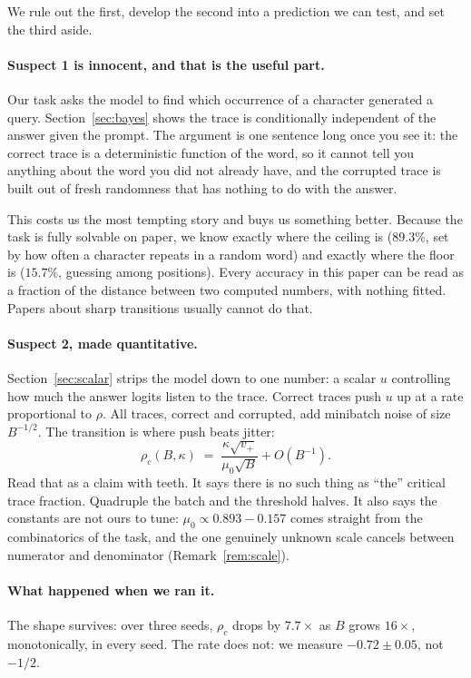 \documentclass{article}
\theoremstyle{plain}
\theoremstyle{definition}
\theoremstyle{remark}
\newcommand{\1}{\mathbf{1}}
\begin{document}
We rule out the first, develop the second into a prediction we can test, and set
the third aside.

\paragraph{Suspect 1 is innocent, and that is the useful part.}
Our task asks the model to find which occurrence of a character generated a
query. Section~\ref{sec:bayes} shows the trace is conditionally independent of
the answer given the prompt. The argument is one sentence long once you see it:
the correct trace is a deterministic function of the word, so it cannot tell you
anything about the word you did not already have, and the corrupted trace is
built out of fresh randomness that has nothing to do with the answer.

This costs us the most tempting story and buys us something better. Because the
task is fully solvable on paper, we know exactly where the ceiling is
($89.3\%$, set by how often a character repeats in a random word) and exactly
where the floor is ($15.7\%$, guessing among positions). Every accuracy in this
paper can be read as a fraction of the distance between two computed numbers,
with nothing fitted. Papers about sharp transitions usually cannot do that.

\paragraph{Suspect 2, made quantitative.}
Section~\ref{sec:scalar} strips the model down to one number: a scalar $u$
controlling how much the answer logits listen to the trace. Correct traces push
$u$ up at a rate proportional to $\rho$. All traces, correct and corrupted, add
minibatch noise of size $B^{-1/2}$. The transition is where push beats jitter:
\begin{equation}
\label{eq:intro-threshold}
\rho_c(B,\kappa) \;=\; \frac{\kappa\sqrt{v_+}}{\mu_0\sqrt B} + O(B^{-1}).
\end{equation}
Read that as a claim with teeth. It says there is no such thing as ``the''
critical trace fraction. Quadruple the batch and the threshold halves. It also
says the constants are not ours to tune: $\mu_0\propto 0.893-0.157$ comes
straight from the combinatorics of the task, and the one genuinely unknown scale
cancels between numerator and denominator (Remark~\ref{rem:scale}).

\paragraph{What happened when we ran it.}
The shape survives: over three seeds, $\rho_c$ drops by $7.7\times$ as $B$ grows
$16\times$, monotonically, in every seed. The rate does not: we measure
$-0.72\pm0.05$, not $-1/2$.
\end{document}
